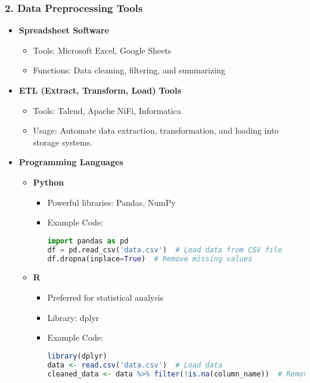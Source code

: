 \documentclass[aspectratio=169]{beamer}
\begin{document}
\begin{frame}[fragile]
    \frametitle{2. Data Preprocessing Tools}
    \begin{itemize}
        \item \textbf{Spreadsheet Software}
        \begin{itemize}
            \item Tools: Microsoft Excel, Google Sheets
            \item Functions: Data cleaning, filtering, and summarizing
        \end{itemize}
        
        \item \textbf{ETL (Extract, Transform, Load) Tools}
        \begin{itemize}
            \item Tools: Talend, Apache NiFi, Informatica
            \item Usage: Automate data extraction, transformation, and loading into storage systems.
        \end{itemize}
        
        \item \textbf{Programming Languages}
        \begin{itemize}
            \item \textbf{Python}
            \begin{itemize}
                \item Powerful libraries: Pandas, NumPy
                \item Example Code:
                \begin{lstlisting}[language=Python]
import pandas as pd
df = pd.read_csv('data.csv')  # Load data from CSV file
df.dropna(inplace=True)  # Remove missing values
                \end{lstlisting}
            \end{itemize}
            
            \item \textbf{R}
            \begin{itemize}
                \item Preferred for statistical analysis
                \item Library: dplyr
                \item Example Code:
                \begin{lstlisting}[language=R]
library(dplyr)
data <- read.csv('data.csv')  # Load data
cleaned_data <- data %>% filter(!is.na(column_name))  # Remove NA values
                \end{lstlisting}
            \end{itemize}
        \end{itemize}
    \end{itemize}
\end{frame}
\end{document}
